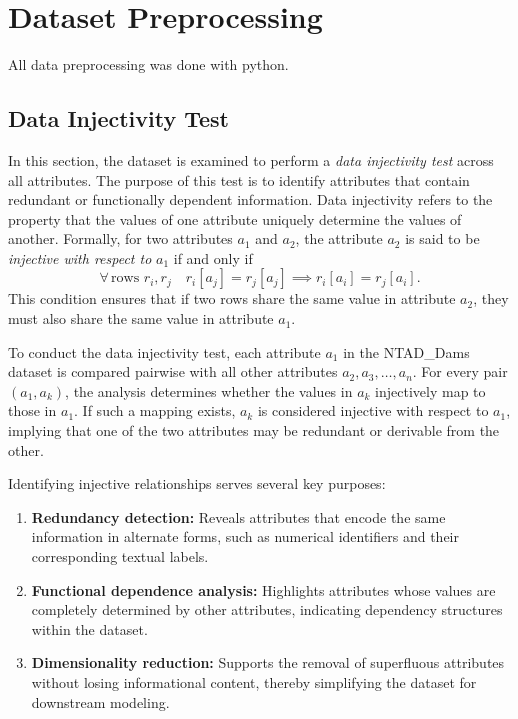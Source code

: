 \documentclass{article}
\begin{document}
\section{Dataset Preprocessing}
All data preprocessing was done with python.

\subsection{Data Injectivity Test}

In this section, the dataset is examined to perform a \textit{data injectivity test} across all attributes. The purpose of this test is to identify attributes that contain redundant or functionally dependent information. Data injectivity refers to the property that the values of one attribute uniquely determine the values of another. Formally, for two attributes \( a_1 \) and \( a_2 \), the attribute \( a_2 \) is said to be \textit{injective with respect to} \( a_1 \) if and only if
\[
\forall\, \text{rows } r_i, r_j \hspace{1em} r_i[a_j] = r_j[a_j] \implies r_i[a_i] = r_j[a_i].
\]
This condition ensures that if two rows share the same value in attribute \( a_2 \), they must also share the same value in attribute \( a_1 \). 

To conduct the data injectivity test, each attribute \( a_1 \) in the NTAD\_Dams dataset is compared pairwise with all other attributes \( a_2, a_3, \dots, a_n \). For every pair \((a_1, a_k)\), the analysis determines whether the values in \( a_k \) injectively map to those in \( a_1 \). If such a mapping exists, \( a_k \) is considered injective with respect to \( a_1 \), implying that one of the two attributes may be redundant or derivable from the other.

Identifying injective relationships serves several key purposes:
\begin{enumerate}
    \item \textbf{Redundancy detection:} Reveals attributes that encode the same information in alternate forms, such as numerical identifiers and their corresponding textual labels.
    \item \textbf{Functional dependence analysis:} Highlights attributes whose values are completely determined by other attributes, indicating dependency structures within the dataset.
    \item \textbf{Dimensionality reduction:} Supports the removal of superfluous attributes without losing informational content, thereby simplifying the dataset for downstream modeling.
\end{enumerate}
\end{document}
